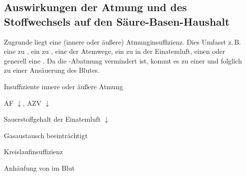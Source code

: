 \bigskip
\subsection{Auswirkungen der Atmung und des Stoffwechsels
auf den Säure-Basen-Haushalt}


 {%
\label{bkm:RefHeading35233321}%
\label{topic:azidose-respiratorische}%
%
%
Zugrunde liegt eine  (innere oder äußere)
Atmunginsuffizienz.
Dies Umfasst z.\,B.  eine zu ,
ein zu , eine  der
Atemwege, ein zu  in der
Einatemluft, einen  oder
generell eine .
Da die -Abatmung vermindert ist, kommt es zu einer
  und
folglich zu einer Ansäuerung des Blutes.

\bigskip

\bigskip

\bigskip

\bigskip
{}
}
{\begin{compactitem}
  \item Insuffiziente innere oder äußere Atmung
  \begin{compactitem}
    \item AF $\downarrow$, AZV $\downarrow$
    \item Sauerstoffgehalt der Einatemluft $\downarrow$
    \item Gasaustausch beeinträchtigt
    \item Kreislaufinsuffizienz
  \end{compactitem}
  \item Anhäufung von
 im Blut
\end{compactitem}}
{}{}{}

% 







